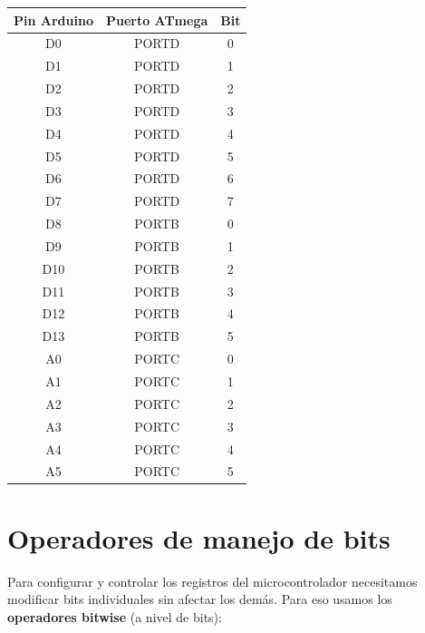 \begin{table}[H]
\centering
\begin{tabular}{ccc}
\toprule
\textbf{Pin Arduino} & \textbf{Puerto ATmega} & \textbf{Bit} \\
\midrule
D0  & PORTD & 0 \\
D1  & PORTD & 1 \\
D2  & PORTD & 2 \\
D3  & PORTD & 3 \\
D4  & PORTD & 4 \\
D5  & PORTD & 5 \\
D6  & PORTD & 6 \\
D7  & PORTD & 7 \\
D8  & PORTB & 0 \\
D9  & PORTB & 1 \\
D10 & PORTB & 2 \\
D11 & PORTB & 3 \\
D12 & PORTB & 4 \\
D13 & PORTB & 5 \\
A0  & PORTC & 0 \\
A1  & PORTC & 1 \\
A2  & PORTC & 2 \\
A3  & PORTC & 3 \\
A4  & PORTC & 4 \\
A5  & PORTC & 5 \\
\bottomrule
\end{tabular}
\end{table}

\section{Operadores de manejo de bits}

Para configurar y controlar los registros del microcontrolador necesitamos
modificar bits individuales sin afectar los demás. Para eso usamos los
\textbf{operadores bitwise} (a nivel de bits):

